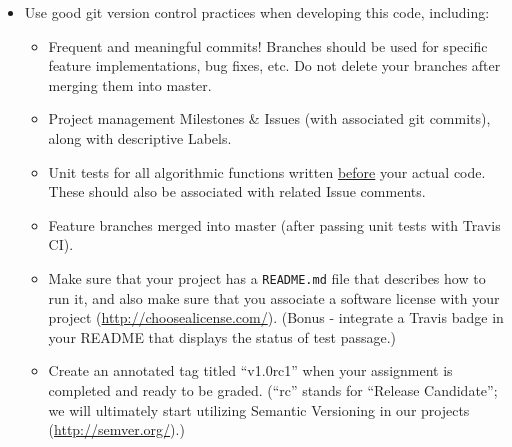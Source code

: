 \begin{itemize}
\item Use good git version control practices when developing this code, including:
\begin{itemize}
    \item Frequent and meaningful commits!  Branches should be used for specific feature implementations, bug fixes, etc.  Do not delete your branches after merging them into master.
    \item Project management Milestones \& Issues (with associated git commits), along with descriptive Labels.
    \item Unit tests for all algorithmic functions written \underline{before} your actual code.  These should also be associated with related Issue comments.
    \item Feature branches merged into master (after passing unit tests with Travis CI).
    \item Make sure that your project has a \verb+README.md+ file that describes how to run it, and also make sure that you associate a software license with your project (\url{http://choosealicense.com/}).  (Bonus - integrate a Travis badge in your README that displays the status of test passage.)
    \item Create an annotated tag titled ``v1.0rc1'' when your assignment is completed and ready to be graded.  (``rc'' stands for ``Release Candidate''; we will ultimately start utilizing Semantic Versioning in our projects (\url{http://semver.org/}).)
\end{itemize}


\end{itemize}
